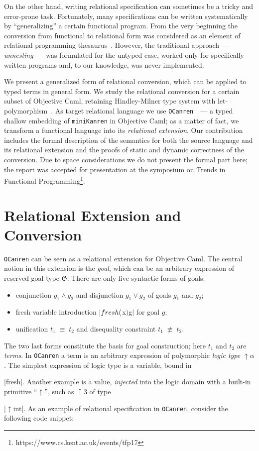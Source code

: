 \documentclass[10pt, oneside, nocopyrightspace]{sigplanconf}
\newcommand{\G}{\mathfrak G}
\newcommand{\miniKanren}{\texttt{miniKanren}\xspace}
\newcommand{\OCanren}{\texttt{OCanren}\xspace}
\newcommand*{\SavedLstInline}{}
\DeclareRobustCommand*{\lstinline}{%
  \ifmmode
    \let\SavedBGroup\bgroup
    \def\bgroup{%
      \let\bgroup\SavedBGroup
      \hbox\bgroup
    }%
  \fi
  \SavedLstInline
}
\begin{document}
On the other hand, writing relational specification can sometimes be a tricky and error-prone task. Fortunately, many 
specifications can be written systematically by ``generalizing'' a certain functional program. From the very beginning 
the conversion from functional to relational form was considered as an element of relational programming thesaurus~\cite{TRS}. However,
the traditional approach~--- \emph{unnesting}~--- was formulated for the untyped case, worked only for specifically written
programs and, to our knowledge, was never implemented.

We present a generalized form of relational conversion, which can be applied to typed terms in general form. We study the relational conversion 
for a certain subset of Objective Caml, retaining Hindley-Milner type system with let-polymorphism~\cite{Types}. As target
relational language we use \OCanren~\cite{ocanren}~--- a typed shallow embedding of \miniKanren in Objective Caml; as a matter of fact, 
we transform a functional language into its \emph{relational extension}. Our contribution includes the formal description of the semantics for 
both the source language and its relational extension and the proofs of static and dynamic correctness of the conversion. Due to space
considerations we do not present the formal part here; the report was accepted for presentation at the symposium on Trends in Functional 
Programming\footnote{https://www.cs.kent.ac.uk/events/tfp17}.

\section{Relational Extension and Conversion}

\OCanren can be seen as a relational extension for Objective Caml. The central notion in this extension is the \emph{goal}, which can be an arbitrary 
expression of reserved goal type $\G$. There are only five syntactic forms of goals:

\begin{itemize}
  \item conjunction $g_1\wedge g_2$ and disjunction $g_1\vee g_2$ of goals $g_1$ and $g_2$;
  \item fresh variable introduction $\lstinline|fresh ($x$) $\;g$|$ for goal $g$;
  \item unification $t_1\;\equiv\;t_2$ and disequality constraint $t_1\;\not\equiv\;t_2$.
\end{itemize}

The two last forms constitute the basis for goal construction; here $t_1$ and $t_2$ are \emph{terms}. In \OCanren a term is
an arbitrary expression of polymorphic \emph{logic type} $\uparrow\!\alpha$. The simplest expression of logic type is a variable, 
bound in \lstinline|fresh|. Another example is a value, \emph{injected} into the logic domain with a built-in primitive 
``$\uparrow$'', such as $\uparrow\!3$ of type \lstinline|$\uparrow$int|. As an example of relational specification in \OCanren, 
consider the following code snippet:
\end{document}
